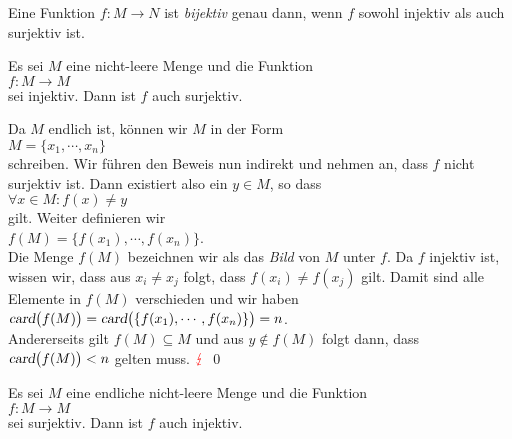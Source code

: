 \begin{Definition}[bijektiv] \lb
  Eine Funktion $f: M \rightarrow N$ ist {\emph{\color{blue}bijektiv}} genau dann, wenn
 $f$ sowohl injektiv als auch surjektiv ist.  
\eoxs
\end{Definition}

\begin{Satz} \label{satz:injektiv_folgt_surjektiv}
  Es sei $M$ eine \underline{\color{red}{endliche}} nicht-leere Menge und die Funktion 
\\[0.2cm]
\hspace*{1.3cm}
$f:M \rightarrow M$
\\[0.2cm]
sei injektiv.  Dann ist $f$ auch surjektiv.
\eoxs
\end{Satz}

\proof
Da $M$ endlich ist, k\"{o}nnen wir $M$ in der Form
\\[0.2cm]
\hspace*{1.3cm}
$M = \{ x_1, \cdots, x_n \}$
\\[0.2cm]
schreiben.  Wir f\"{u}hren den Beweis nun indirekt und nehmen an, dass $f$ nicht surjektiv ist.  Dann
existiert also ein $y \in M$, so dass
\\[0.2cm]
\hspace*{1.3cm}
$\forall x \in M: f(x) \not = y$
\\[0.2cm]
gilt.  Weiter definieren wir
\\[0.2cm]
\hspace*{1.3cm}
$f(M) = \{f(x_1), \cdots, f(x_n) \}$.
\\[0.2cm]
Die Menge $f(M)$ bezeichnen wir als das \emph{\color{blue}Bild} von $M$ unter $f$.
Da $f$ injektiv ist, wissen wir, dass aus  $x_i \not= x_j$ folgt, dass $f(x_i) \not= f(x_j)$ gilt.
Damit sind alle Elemente in $f(M)$ verschieden und wir haben
\\[0.2cm]
\hspace*{1.3cm}
$\textsl{card}\bigl(f(M)\bigr) = \textsl{card}\bigl(\{f(x_1), \cdots, f(x_n) \}\bigr) = n$.
\\[0.2cm]
Andererseits gilt $f(M) \subseteq M$ und aus $y \not\in f(M)$ folgt dann, dass
\\[0.2cm]
\hspace*{1.3cm}
$\textsl{card}\bigl(f(M)\bigr) < n$ gelten muss. ${\color{red}{\lightning}}$  \qed


\begin{Satz}
  Es sei $M$ eine endliche nicht-leere Menge und die Funktion 
  \\[0.2cm]
  \hspace*{1.3cm}
  $f:M \rightarrow M$
  \\[0.2cm]
  sei surjektiv.  Dann ist $f$ auch injektiv.
\end{Satz}

